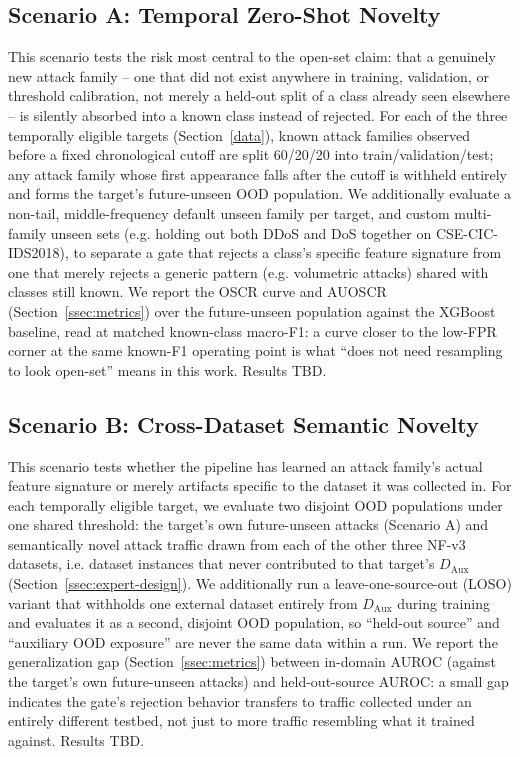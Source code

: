 \documentclass[sigconf]{acmart}
\begin{document}
\subsection{Scenario A: Temporal Zero-Shot Novelty} \label{sec:openset}
This scenario tests the risk most central to the open-set claim: that a genuinely new attack family -- one that did not exist anywhere in training, validation, or threshold calibration, not merely a held-out split of a class already seen elsewhere -- is silently absorbed into a known class instead of rejected. For each of the three temporally eligible targets (Section~\ref{data}), known attack families observed before a fixed chronological cutoff are split 60/20/20 into train/validation/test; any attack family whose first appearance falls after the cutoff is withheld entirely and forms the target's future-unseen OOD population. We additionally evaluate a non-tail, middle-frequency default unseen family per target, and custom multi-family unseen sets (e.g. holding out both DDoS and DoS together on CSE-CIC-IDS2018), to separate a gate that rejects a class's specific feature signature from one that merely rejects a generic pattern (e.g. volumetric attacks) shared with classes still known. We report the OSCR curve and AUOSCR (Section~\ref{ssec:metrics}) over the future-unseen population against the XGBoost baseline, read at matched known-class macro-F1: a curve closer to the low-FPR corner at the same known-F1 operating point is what ``does not need resampling to look open-set'' means in this work. Results TBD.

\subsection{Scenario B: Cross-Dataset Semantic Novelty} \label{ssec:scenario-b}
This scenario tests whether the pipeline has learned an attack family's actual feature signature or merely artifacts specific to the dataset it was collected in. For each temporally eligible target, we evaluate two disjoint OOD populations under one shared threshold: the target's own future-unseen attacks (Scenario A) and semantically novel attack traffic drawn from each of the other three NF-v3 datasets, i.e. dataset instances that never contributed to that target's $D_{\mathrm{Aux}}$ (Section~\ref{ssec:expert-design}). We additionally run a leave-one-source-out (LOSO) variant that withholds one external dataset entirely from $D_{\mathrm{Aux}}$ during training and evaluates it as a second, disjoint OOD population, so ``held-out source'' and ``auxiliary OOD exposure'' are never the same data within a run. We report the generalization gap (Section~\ref{ssec:metrics}) between in-domain AUROC (against the target's own future-unseen attacks) and held-out-source AUROC: a small gap indicates the gate's rejection behavior transfers to traffic collected under an entirely different testbed, not just to more traffic resembling what it trained against. Results TBD.
\end{document}
